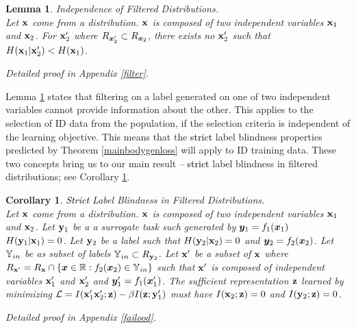 \documentclass{article} %
\theoremstyle{plain}
\newtheorem{lemma}[theorem]{Lemma}
\newtheorem{corollary}[theorem]{Corollary}
\theoremstyle{definition}
\theoremstyle{remark}
\begin{document}
\begin{lemma} Independence of Filtered Distributions. \\
    Let ${\mathbf{x}}$ come from a distribution. ${\mathbf{x}}$ is composed of two independent variables ${\mathbf{x}}_1$ and ${\mathbf{x}}_2$. For ${\mathbf{x}}_2'$ where
    $R_{{\bm{x}}_2'} \subset R_{{\bm{x}}_2}$, there exists no ${\mathbf{x}}_2'$ such that $H({\mathbf{x}}_1|{\mathbf{x}}_2') < H({\mathbf{x}}_1)$.

Detailed proof in Appendix \ref{filter}.

\label{mainbodyfilter}
\end{lemma}

Lemma \ref{mainbodyfilter} states that filtering on a label generated on one of two independent variables cannot provide information about the other. This applies to the selection of ID data from the population, if the selection criteria is independent of the learning objective. This means that the \textcolor{black}{strict} label blindness properties predicted by Theorem \ref{mainbodygenloss} will apply to ID training data. These two concepts bring us to our main result -- \textcolor{black}{strict} label blindness in filtered distributions; see Corollary \ref{mainbodyfailood}. 

\begin{corollary}\textcolor{black}{Strict} Label Blindness in Filtered Distributions. \\
    Let ${\mathbf{x}}$ come from a distribution. ${\mathbf{x}}$ is composed of two independent variables ${\mathbf{x}}_1$ and ${\mathbf{x}}_2$. Let ${\mathbf{y}}_1$ be a a surrogate task such generated by ${\bm{y}}_1 = f_1({\bm{x}}_1)$ $H({\mathbf{y}}_1|{\mathbf{x}}_1) = 0$. Let ${\mathbf{y}}_2$ be a label such that $H({\mathbf{y}}_2|{\mathbf{x}}_2) = 0$ and ${\bm{y}}_2 = f_2({\bm{x}}_2)$. Let ${\mathbb{Y}}_{in}$ be as subset of labels ${\mathbb{Y}}_{in} \subset R_{{\mathbf{y}}_2}$. Let ${\mathbf{x}}'$ be a subset of ${\mathbf{x}}$ where $R_{{\mathbf{x}}'} =  R_{{\mathbf{x}}} \cap \{{\bm{x}} \in \mathbb{R}: f_2({\bm{x}}_2) \in {\mathbb{Y}}_{in} \}  $ such that ${\mathbf{x}}'$ is composed of independent variables ${\mathbf{x}}_1'$ and ${\mathbf{x}}_2'$ and ${\bm{y}}_1' = f_1({\bm{x}}_1')$. The sufficient representation ${\mathbf{z}}$ learned by minimizing $\mathcal{L} = I({\mathbf{x}}_1' {\mathbf{x}}_2'; {\mathbf{z}}) - \beta I({\mathbf{z}};{\mathbf{y}}_1')$ must have $I({\mathbf{x}}_2;{\mathbf{z}}) = 0$ and $I({\mathbf{y}}_2;{\mathbf{z}}) = 0$.
    

    \label{mainbodyfailood}
    
    Detailed proof in Appendix \ref{failood}.
    
\end{corollary}
\end{document}
